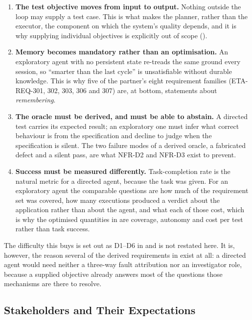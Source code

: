 \begin{enumerate}[label=\textbf{(\alph*)},leftmargin=2.8em]
  \item \textbf{The test objective moves from input to output.} Nothing outside
    the loop may supply a test case. This is what makes the planner, rather than
    the executor, the component on which the system's quality depends, and it is
    why supplying individual objectives is explicitly out of scope
    ().
  \item \textbf{Memory becomes mandatory rather than an optimisation.} An
    exploratory agent with no persistent state re-treads the same ground every
    session, so ``smarter than the last cycle'' is unsatisfiable without
    durable knowledge. This is why five of the partner's eight requirement families (ETA-REQ-301, 302, 303, 306 and 307) are, at bottom, statements about \emph{remembering}.
  \item \textbf{The oracle must be derived, and must be able to abstain.} A
    directed test carries its expected result; an exploratory one must infer
    what correct behaviour is from the specification and decline to judge when
    the specification is silent. The two failure modes of a derived oracle, a fabricated defect and a silent pass, are what NFR-D2 and NFR-D3 exist to prevent.
  \item \textbf{Success must be measured differently.} Task-completion rate is
    the natural metric for a directed agent, because the task was given. For an
    exploratory agent the comparable questions are how much of the requirement
    set was covered, how many executions produced a verdict about the
    application rather than about the agent, and what each of those cost, which is why the optimised quantities in  are
    coverage, autonomy and cost per test rather than task success.
\end{enumerate}

The difficulty this buys is set out as D1--D6 in  and is
not restated here. It is, however, the reason several of the derived
requirements in  exist at all: a directed agent would
need neither a three-way fault attribution nor an investigator role, because a
supplied objective already answers most of the questions those mechanisms are
there to resolve.

\subsection{Stakeholders and Their Expectations}
\label{subsec:stakeholders}

